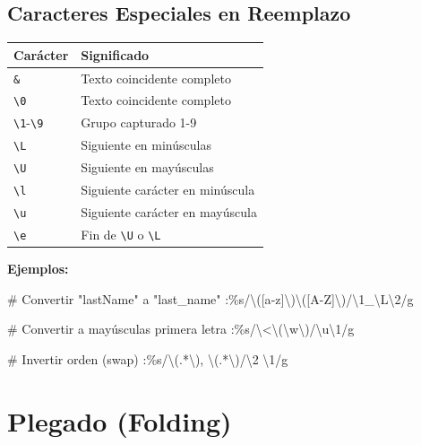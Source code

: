\documentclass[
  doc,
  floatsintext,
  longtable,
  a4paper,
  nolmodern,
  notxfonts,
  notimes,
  12pt,
  colorlinks=true,linkcolor=blue,citecolor=blue,urlcolor=blue]{apa7}
\newenvironment{Shaded}{\begin{snugshade}}{\end{snugshade}}
\newcommand{\NormalTok}[1]{\textcolor[rgb]{0.00,0.23,0.31}{#1}}
\newcounter{none} %
\begin{document}
\subsection{Caracteres Especiales en
Reemplazo}\label{caracteres-especiales-en-reemplazo}

{\def\LTcaptype{none} %
\begin{longtable}[]{@{}ll@{}}
\toprule\noalign{}
Carácter & Significado \\
\midrule\noalign{}
\endhead
\bottomrule\noalign{}
\endlastfoot
\texttt{\&} & Texto coincidente completo \\
\texttt{\textbackslash{}0} & Texto coincidente completo \\
\texttt{\textbackslash{}1}-\texttt{\textbackslash{}9} & Grupo capturado
1-9 \\
\texttt{\textbackslash{}L} & Siguiente en minúsculas \\
\texttt{\textbackslash{}U} & Siguiente en mayúsculas \\
\texttt{\textbackslash{}l} & Siguiente carácter en minúscula \\
\texttt{\textbackslash{}u} & Siguiente carácter en mayúscula \\
\texttt{\textbackslash{}e} & Fin de \texttt{\textbackslash{}U} o
\texttt{\textbackslash{}L} \\
\end{longtable}
}

\textbf{Ejemplos:}

\begin{Shaded}
\begin{Highlighting}[]
\NormalTok{\# Convertir "lastName" a "last\_name"}
\NormalTok{:\%s/\textbackslash{}([a{-}z]\textbackslash{})\textbackslash{}([A{-}Z]\textbackslash{})/\textbackslash{}1\_\textbackslash{}L\textbackslash{}2/g}

\NormalTok{\# Convertir a mayúsculas primera letra}
\NormalTok{:\%s/\textbackslash{}\textless{}\textbackslash{}(\textbackslash{}w\textbackslash{})/\textbackslash{}u\textbackslash{}1/g}

\NormalTok{\# Invertir orden (swap)}
\NormalTok{:\%s/\textbackslash{}(.*\textbackslash{}), \textbackslash{}(.*\textbackslash{})/\textbackslash{}2 \textbackslash{}1/g}
\end{Highlighting}
\end{Shaded}

\section{Plegado (Folding)}\label{plegado-folding}
\end{document}
